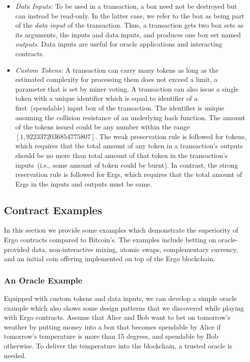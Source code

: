  \begin{itemize}
    \item {\em Data Inputs: }
 To be used in a transaction, a box need not be destroyed but can instead be read-only. In the latter case, we refer to the box as being part of the {\em data input} of the transaction. Thus, a transaction gets two box sets as its arguments, the inputs and
 data inputs, and produces one box set named {\em outputs}. Data inputs are useful for oracle applications and interacting contracts.

    \item {\em Custom Tokens: }
 A transaction can carry many tokens as long as the estimated complexity for processing them does not exceed a limit, a parameter that is set by miner voting. A transaction can also issue a single token with a unique identifier which is equal to identifier of a first~(spendable) input box of the transaction. The identifier is unique assuming the collision resistance of an underlying hash function.
 The amount of the tokens issued could be any number within the range $[1, 9223372036854775807]$. The weak preservation rule is followed for tokens, which requires that the total amount of any token in a transaction's outputs should be no more
 than total amount of that token in the transaction's inputs~(i.e., some amount of token could be burnt). In contrast, the strong reservation rule is followed for Ergs, which requires that the total amount of Ergs in the inputs and outputs must be same.
 \end{itemize}

\subsection{Contract Examples}
\label{sec:examples}

 In this section we provide some examples which demonstrate the superiority of Ergo contracts compared to Bitcoin's. The examples include betting on oracle-provided data, non-interactive mixing, atomic swaps, complementary currency, and an initial coin offering implemented on top of the Ergo blockchain.

 \subsubsection{An Oracle Example}
 \label{sec:platform}

 Equipped with custom tokens and data inputs, we can develop a simple oracle example which also shows some design patterns that we discovered while playing with Ergo contracts. Assume that Alice and Bob want to bet on tomorrow's weather by putting money into a box that becomes spendable by Alice if tomorrow's temperature is more than 15 degrees, and spendable by Bob otherwise. To deliver the temperature into the blockchain, a trusted oracle is needed.

